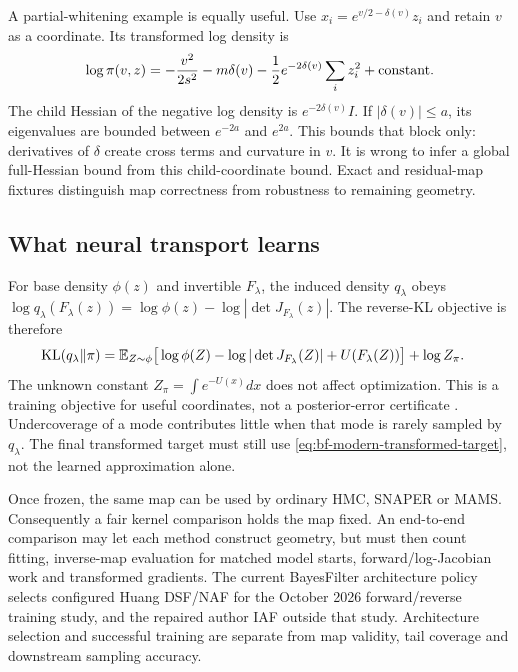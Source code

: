 A partial-whitening example is equally useful. Use
$x_i=e^{v/2-\delta(v)}z_i$ and retain $v$ as a coordinate. Its transformed
log density is
\begin{equation}
 \log\pi(v,z)=-\frac{v^2}{2s^2}-m\delta(v)
                    -\frac12e^{-2\delta(v)}\sum_i z_i^2+\hbox{constant}.
 \label{eq:bf-modern-funnel-partial}
\end{equation}
The child Hessian of the negative log density is
$e^{-2\delta(v)}I$. If $|\delta(v)|\leq a$, its eigenvalues are bounded
between $e^{-2a}$ and $e^{2a}$. This bounds that block only: derivatives of
$\delta$ create cross terms and curvature in $v$. It is wrong to infer a
global full-Hessian bound from this child-coordinate bound. Exact and
residual-map fixtures distinguish map correctness from robustness to remaining
geometry.

\subsection{What neural transport learns}

For base density $\phi(z)$ and invertible $F_\lambda$, the induced density
$q_\lambda$ obeys
$\log q_\lambda(F_\lambda(z))=\log\phi(z)-\log|\det J_{F_\lambda}(z)|$.
The reverse-KL objective is therefore
\begin{align}
 \mathrm{KL}(q_\lambda\|\pi)
 &=\mathbb{E}_{Z\sim\phi}\big[
      \log\phi(Z)-\log|\det J_{F_\lambda}(Z)|
                     +U(F_\lambda(Z))\big]+\log Z_\pi.
 \label{eq:bf-modern-neutra-objective}
\end{align}
The unknown constant $Z_\pi=\int e^{-U(x)}dx$ does not affect optimization.
This is a training objective for useful coordinates, not a posterior-error
certificate \citep{hoffman2019neutra}. Undercoverage of a mode contributes
little when that mode is rarely sampled by $q_\lambda$. The final transformed
target must still use \eqref{eq:bf-modern-transformed-target}, not the learned
approximation alone.

Once frozen, the same map can be used by ordinary HMC, SNAPER or MAMS.
Consequently a fair kernel comparison holds the map fixed. An end-to-end
comparison may let each method construct geometry, but must then count fitting,
inverse-map evaluation for matched model starts, forward/log-Jacobian work
and transformed gradients. The current BayesFilter architecture policy selects
configured Huang DSF/NAF for the October 2026 forward/reverse training study,
and the repaired author IAF outside that study. Architecture selection and
successful training are separate from map validity, tail coverage and
downstream sampling accuracy.

